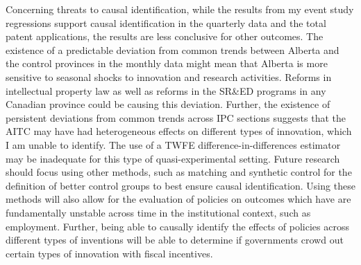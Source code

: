 \documentclass[../main.tex]{subfiles}
\begin{document}
Concerning threats to causal identification, while the results from my event study regressions support causal identification in the quarterly data and the total patent applications, the results are less conclusive for other outcomes. The existence of a predictable deviation from common trends between Alberta and the control provinces in the monthly data might mean that Alberta is more sensitive to seasonal shocks to innovation and research activities. Reforms in intellectual property law as well as reforms in the SR\&ED programs in any Canadian province could be causing this deviation. Further, the existence of persistent deviations from common trends across IPC sections suggests that the AITC may have had heterogeneous effects on different types of innovation, which I am unable to identify. The use of a TWFE difference-in-differences estimator may be inadequate for this type of quasi-experimental setting. Future research should focus using other methods, such as matching \parencite{caliendo_kopeinig08a} and synthetic control \parencite{abadie_etal10} for the definition of better control groups to best ensure causal identification. Using these methods will also allow for the evaluation of policies on outcomes which have are fundamentally unstable across time in the institutional context, such as employment. Further, being able to causally identify the effects of policies across different types of inventions will be able to determine if governments crowd out certain types of innovation with fiscal incentives. 
\end{document}
